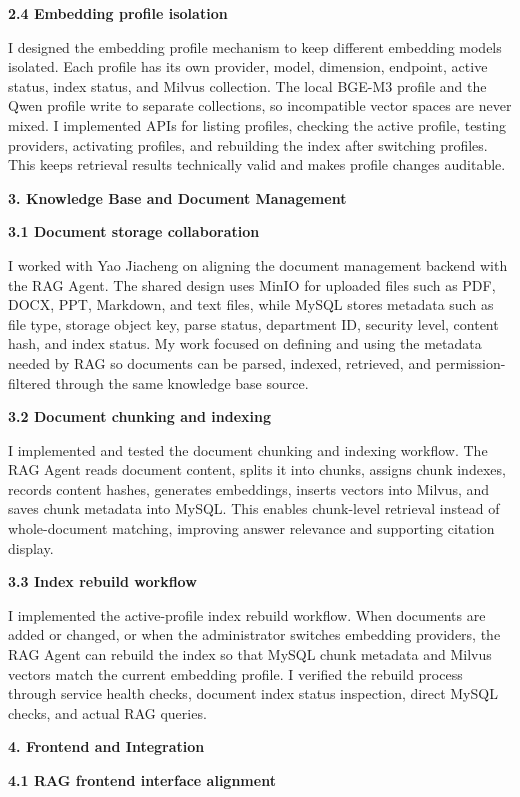 \textbf{2.4 Embedding profile isolation}

I designed the embedding profile mechanism to keep different embedding models isolated. Each profile has its own provider, model, dimension, endpoint, active status, index status, and Milvus collection. The local BGE-M3 profile and the Qwen profile write to separate collections, so incompatible vector spaces are never mixed. I implemented APIs for listing profiles, checking the active profile, testing providers, activating profiles, and rebuilding the index after switching profiles. This keeps retrieval results technically valid and makes profile changes auditable.

\textbf{3. Knowledge Base and Document Management}

\textbf{3.1 Document storage collaboration}

I worked with Yao Jiacheng on aligning the document management backend with the RAG Agent. The shared design uses MinIO for uploaded files such as PDF, DOCX, PPT, Markdown, and text files, while MySQL stores metadata such as file type, storage object key, parse status, department ID, security level, content hash, and index status. My work focused on defining and using the metadata needed by RAG so documents can be parsed, indexed, retrieved, and permission-filtered through the same knowledge base source.

\textbf{3.2 Document chunking and indexing}

I implemented and tested the document chunking and indexing workflow. The RAG Agent reads document content, splits it into chunks, assigns chunk indexes, records content hashes, generates embeddings, inserts vectors into Milvus, and saves chunk metadata into MySQL. This enables chunk-level retrieval instead of whole-document matching, improving answer relevance and supporting citation display.

\textbf{3.3 Index rebuild workflow}

I implemented the active-profile index rebuild workflow. When documents are added or changed, or when the administrator switches embedding providers, the RAG Agent can rebuild the index so that MySQL chunk metadata and Milvus vectors match the current embedding profile. I verified the rebuild process through service health checks, document index status inspection, direct MySQL checks, and actual RAG queries.

\textbf{4. Frontend and Integration}

\textbf{4.1 RAG frontend interface alignment}

